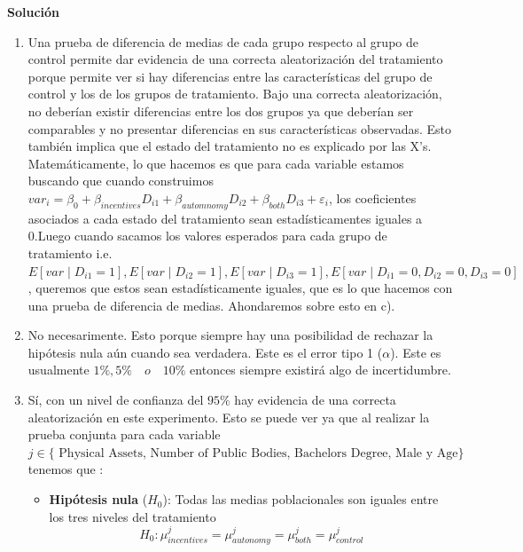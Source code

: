 \documentclass[a4paper, answers, addpoints, 11pt]{exam}
\newenvironment{solucion}{%
  \begin{mdframed}[
    backgroundcolor=blue!5,    %
    linecolor=blue!50,          %
    linewidth=2pt,              %
    leftmargin=10pt,            %
    rightmargin=10pt,           %
    topline=true,              %
    bottomline=true,            %
    roundcorner=10pt,           %
    innerleftmargin=10pt,       %
    innerrightmargin=10pt,      %
    innerbottommargin=10pt,     %
    innertopmargin=10pt         %
  ]%
  \begin{tcolorbox}[colframe=blue!50!black, colback=blue!50, coltitle=white, sharp corners=all, boxrule=1mm, width=\textwidth, halign=left, valign=center, top=0mm, bottom=0mm, left=0mm, right=0mm] \textbf{Solución} \end{tcolorbox} }{\end{mdframed}}
\begin{document}
\begin{enumerate}
\begin{solucion}
        \begin{enumerate}
            \item Una prueba de diferencia de medias de cada grupo respecto al grupo de control permite  dar evidencia de una correcta aleatorización del tratamiento porque permite ver si hay diferencias entre las características del grupo de control y los de los grupos de tratamiento.
            Bajo una correcta aleatorización, no deberían existir diferencias entre los dos grupos ya que deberían ser comparables y no presentar diferencias en sus características observadas. Esto también implica que el estado del tratamiento no es explicado por las X's. \\ Matemáticamente, lo que hacemos es que para cada variable estamos buscando que cuando construimos 
            $
var_i = \beta_0 + \beta_{incentives} D_{i1} + \beta_{automnomy} D_{i2} +  \beta_{both} D_{i3} + \varepsilon_i$, los coeficientes asociados a cada estado del tratamiento sean estadísticamentes iguales a 0.Luego cuando sacamos los valores esperados para cada grupo de tratamiento i.e. $E[var \mid D_{i1}=1], E[var \mid D_{i2}=1],E[var \mid D_{i3}=1], E[var \mid D_{i1}=0, D_{i2}=0, D_{i3}=0]$, queremos que estos sean estadísticamente iguales, que es lo que hacemos con una prueba de diferencia de medias. Ahondaremos sobre esto en c).

            
            \item No  necesarimente. Esto porque siempre hay una posibilidad de rechazar la hipótesis nula aún cuando sea verdadera. Este es el error tipo 1 ($\alpha$). Este es usualmente $1\%, 5\% \quad o \quad 10\%$ entonces siempre existirá algo de incertidumbre.
            \item Sí, con un nivel de confianza del $95\%$ hay evidencia de una correcta aleatorización en este experimento. Esto se puede ver ya que al realizar la prueba conjunta para cada variable $j\in \{\text{ Physical Assets, Number of Public Bodies, Bachelors Degree, Male y Age} \} $ tenemos que :
           

            

         


\begin{itemize}
    \item \textbf{Hipótesis nula} (\(H_0\)): Todas las medias poblacionales son iguales entre los tres niveles del tratamiento
    \[
    H_0: \mu_{incentives}^j = \mu_{autonomy}^j  = \mu_{both}^j = \mu_{control}^j
    \]
   

\end{itemize}
\end{enumerate}
\end{solucion}
\end{enumerate}
\end{document}
